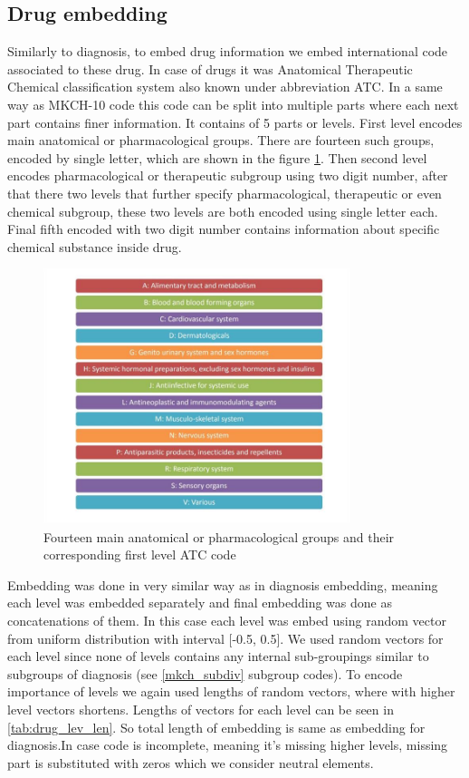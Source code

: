 \subsection{Drug embedding}

Similarly to diagnosis, to embed drug information we embed international code associated to these drug. In case of drugs it was Anatomical Therapeutic Chemical classification system also known under abbreviation ATC. In a same way as MKCH-10 code this code can be split into multiple parts where each next part contains finer information. It contains of 5 parts or levels. First level encodes main anatomical or pharmacological groups. There are fourteen such groups, encoded by single letter, which are shown in the figure \ref{fig:atc_l1}. Then second level encodes pharmacological or therapeutic subgroup using two digit number, after that there two levels that further specify pharmacological, therapeutic or even chemical subgroup, these two levels are both encoded using single letter each. Final fifth encoded with two digit number contains information about specific chemical substance inside drug.

\begin{figure}[!h]
	\centering
	
	\includegraphics[width=0.8\textwidth]{images/atc_l1_classification_who.jpg}
	
	\caption{Fourteen main anatomical or pharmacological groups and their corresponding first level ATC code \cite{atc_who}}
	\label{fig:atc_l1}
\end{figure}

Embedding was done in very similar way as in diagnosis embedding, meaning each level was embedded separately and final embedding was done as concatenations of them. In this case each level was embed using random vector from uniform distribution with interval [-0.5, 0.5]. We used random vectors for each level since none of levels contains any internal sub-groupings similar to subgroups of diagnosis (see \ref{mkch_subdiv} subgroup codes). To encode importance of levels we again used lengths of random vectors, where with higher level vectors shortens. Lengths of vectors for each level can be seen in \ref{tab:drug_lev_len}. So total length of embedding is same as embedding for diagnosis.In case code is incomplete, meaning it's missing higher levels, missing part is substituted with zeros which we consider neutral elements.
\\

